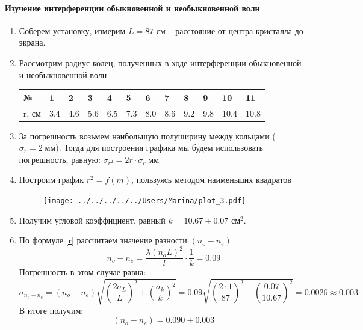 \documentclass[a4paper,12pt]{article}
\begin{document}
\paragraph{Изучение интерференции обыкновенной и необыкновенной волн}
\begin{enumerate}
\itemsep0em
\item Соберем установку, измерим  $L = 87$ см -- расстояние от центра кристалла до экрана.
\item Рассмотрим радиус колец, полученных в ходе интерференции обыкновенной и необыкновенной волн
\begin{table}[h!]
\centering
\begin{tabular}{|l|l|l|l|l|l|l|l|l|l|l|l|}
\hline
№     & 1   & 2   & 3   & 4   & 5   & 6   & 7   & 8   & 9   & 10   & 11   \\ \hline
r, см & 3.4 & 4.6 & 5.6 & 6.5 & 7.3 & 8.0 & 8.6 & 9.2 & 9.8 & 10.4 & 10.8 \\ \hline
\end{tabular}
\end{table} 
\item За погрешность возьмем наибольшую полуширину между кольцами ($\sigma_{r} = 2\;\text{мм}$). Тогда для построения графика мы будем использовать погрешность, равную: $\sigma_{r^2} = 2r\cdot\sigma_{r}\;\text{мм}$ 
\item Построим график $r^2=f(m)$, пользуясь методом наименьших квадратов
\begin{figure}[h!]
\centering
\texttt{[image: ../../../../../Users/Marina/plot\_3.pdf]} 
\end{figure}
\item Получим угловой коэффициент, равный $k = 10.67\pm 0.07$ см$^2$.
\item По формуле \ref{r} рассчитаем значение разности $(n_{o}-n_{e})$
\begin{equation*}
n_{o}-n_{e} = \frac{\lambda(n_{o}L)^2}{l}\cdot \frac{1}{k} = 0.09
\end{equation*}   
Погрешность в этом случае равна:
\begin{equation*}
\sigma_{n_{o}-n_{e}} = (n_{o}-n_{e})\sqrt{\left( \frac{2\sigma_{L}}{L}\right)^2+\left(\frac{\sigma_{k}}{k}\right)^2} = 0.09\sqrt{\left( \frac{2\cdot 1}{87}\right)^2+\left(\frac{0.07}{10.67}\right)^2}=0.0026\approx 0.003
\end{equation*}
В итоге получим:
\[(n_{o}-n_{e})=0.090\pm 0.003\]
\end{enumerate}
\end{document}
